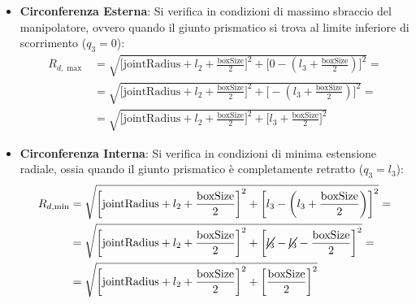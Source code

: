 ﻿\documentclass[11pt, a4paper]{article}
\begin{document}
\begin{itemize}
  \item \textbf{Circonferenza Esterna}: Si verifica in condizioni di massimo sbraccio del manipolatore, ovvero quando il giunto prismatico si trova al limite inferiore di scorrimento ($q_3 = 0$):
    \begin{align*}
      R_{d,\max} &= \sqrt{\biggl[ \text{jointRadius} + l_{2} + \frac{\text{boxSize}}{2} \biggr]^{2} +  \biggl[ 0 - \left(l_{3} + \frac{\text{boxSize}}{2}\right) \biggr]^{2}} =\\
      &= \sqrt{\biggl[ \text{jointRadius} + l_{2} + \frac{\text{boxSize}}{2} \biggr]^{2} +  \biggl[ - \left(l_{3} + \frac{\text{boxSize}}{2}\right) \biggr]^{2}} =\\
      &= \sqrt{\biggl[ \text{jointRadius} + l_{2} + \frac{\text{boxSize}}{2} \biggr]^{2} +  \biggl[ l_{3} + \frac{\text{boxSize}}{2} \biggr]^{2}}
    \end{align*}
    \item \textbf{Circonferenza Interna}: Si verifica in condizioni di minima estensione radiale, ossia quando il giunto prismatico è completamente retratto ($q_3 = l_3$):
    \begin{align*}
      R_{d,\min} &= \sqrt{\biggl[ \text{jointRadius} + l_{2} + \frac{\text{boxSize}}{2} \biggr]^{2} +  \biggl[ l_{3} - \left(l_{3} + \frac{\text{boxSize}}{2}\right) \biggr]^{2}} = \\
      &= \sqrt{\biggl[ \text{jointRadius} + l_{2} + \frac{\text{boxSize}}{2} \biggr]^{2} +  \biggl[ \cancel{l_{3}} - \cancel{l_{3}} - \frac{\text{boxSize}}{2} \biggr]^{2}} =\\
      & = \sqrt{\biggl[ \text{jointRadius} + l_{2} + \frac{\text{boxSize}}{2} \biggr]^{2} +  \biggl[\frac{\text{boxSize}}{2} \biggr]^{2}}
    \end{align*}
\end{itemize}
\end{document}
